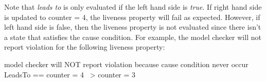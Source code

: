 Note that \textit{leads to} is only evaluated if the left hand side is
\textit{true}. If right hand side is updated to counter = 4, the liveness
property will fail as expected. However, if left hand side is false, then the
liveness property is not evaluated since there isn't a state that satisfies the
cause condition. For example, the model checker will not report violation for
the following liveness property:\newline
\begin{tla}
    \* model checker will NOT report violation because cause condition never occur 
    LeadsTo == counter = 4 ~> counter = 3
\end{tla}
\begin{tlatex}
%
%
\@xx{}%
\end{tlatex}

% 
